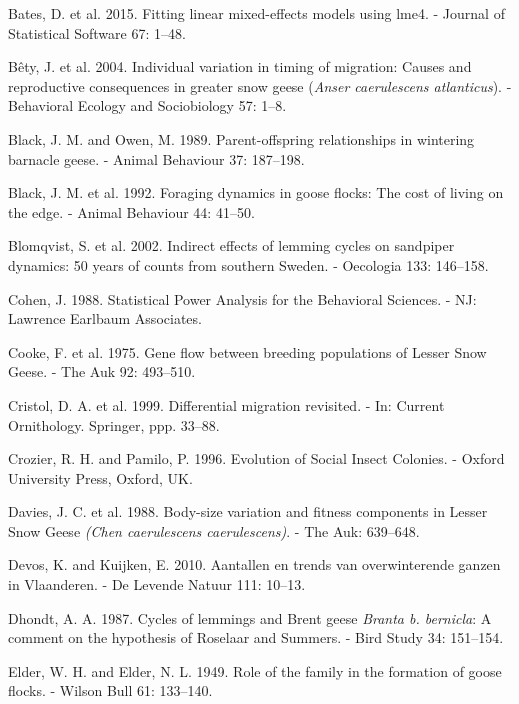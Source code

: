 \documentclass[10pt,twocolumn]{paper}
\begin{document}
\hypertarget{ref-lme4}{}
Bates, D. et al. 2015. Fitting linear mixed-effects models using lme4. -
Journal of Statistical Software 67: 1--48.

\hypertarget{ref-Buxeaty2004}{}
Bêty, J. et al. 2004. Individual variation in timing of migration:
Causes and reproductive consequences in greater snow geese (\emph{Anser
caerulescens atlanticus}). - Behavioral Ecology and Sociobiology 57:
1--8.

\hypertarget{ref-black1989parent}{}
Black, J. M. and Owen, M. 1989. Parent-offspring relationships in
wintering barnacle geese. - Animal Behaviour 37: 187--198.

\hypertarget{ref-black1992foraging}{}
Black, J. M. et al. 1992. Foraging dynamics in goose flocks: The cost of
living on the edge. - Animal Behaviour 44: 41--50.

\hypertarget{ref-blomqvist2002indirect}{}
Blomqvist, S. et al. 2002. Indirect effects of lemming cycles on
sandpiper dynamics: 50 years of counts from southern Sweden. - Oecologia
133: 146--158.

\hypertarget{ref-cohen1988statistical}{}
Cohen, J. 1988. Statistical Power Analysis for the Behavioral Sciences.
- NJ: Lawrence Earlbaum Associates.

\hypertarget{ref-cooke1975gene}{}
Cooke, F. et al. 1975. Gene flow between breeding populations of Lesser
Snow Geese. - The Auk 92: 493--510.

\hypertarget{ref-cristol1999differential}{}
Cristol, D. A. et al. 1999. Differential migration revisited. - In:
Current Ornithology. Springer, ppp. 33--88.

\hypertarget{ref-crozier1996evolution}{}
Crozier, R. H. and Pamilo, P. 1996. Evolution of Social Insect Colonies.
- Oxford University Press, Oxford, UK.

\hypertarget{ref-davies1988body}{}
Davies, J. C. et al. 1988. Body-size variation and fitness components in
Lesser Snow Geese \emph{(Chen caerulescens caerulescens)}. - The Auk:
639--648.

\hypertarget{ref-devos2010aantallen}{}
Devos, K. and Kuijken, E. 2010. Aantallen en trends van overwinterende
ganzen in Vlaanderen. - De Levende Natuur 111: 10--13.

\hypertarget{ref-dhondt1987cycles}{}
Dhondt, A. A. 1987. Cycles of lemmings and Brent geese \emph{Branta b.
bernicla}: A comment on the hypothesis of Roselaar and Summers. - Bird
Study 34: 151--154.

\hypertarget{ref-elder1949role}{}
Elder, W. H. and Elder, N. L. 1949. Role of the family in the formation
of goose flocks. - Wilson Bull 61: 133--140.
\end{document}
